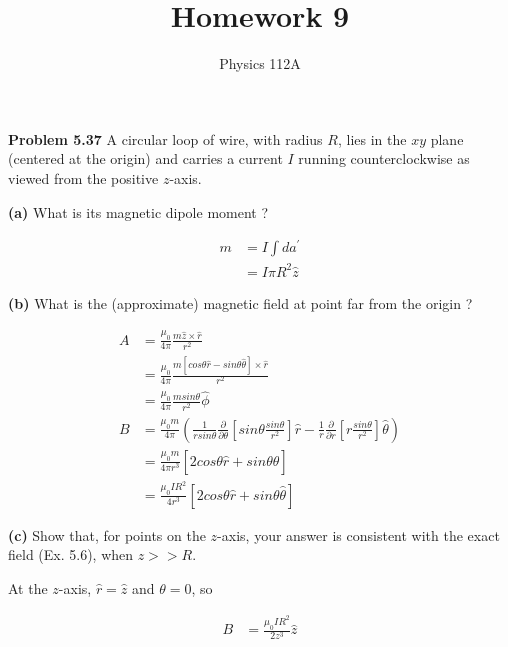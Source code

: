 \documentclass{article}
\title{Homework 9}
\author{Physics 112A}
\date{}
\begin{document}
\maketitle

\textbf{Problem 5.37}
A circular loop of wire, with radius $R$, lies in the $xy$ plane (centered at the origin) and carries a current $I$ running counterclockwise as viewed from the positive $z$-axis.

\textbf{(a)}
What is its magnetic dipole moment ?

\begin{equation*}
\begin{split}
	m & = I \int da^\prime \\
	& = \boxed{I \pi R^2 \hat{z}}
\end{split}
\end{equation*}

\textbf{(b)}
What is the (approximate) magnetic field at point far from the origin ?

\begin{equation*}
\begin{split}
	A & = \frac{\mu_0}{4 \pi} \frac{m \hat{z} \times \hat{r}}{r^2} \\
	& = \frac{\mu_0}{4 \pi} \frac{m [cos\theta \hat{r} - sin\theta \hat{\theta}] \times \hat{r}}{r^2} \\
	& = \frac{\mu_0}{4 \pi} \frac{m sin\theta}{r^2} \hat{\phi} \\
	B & = \frac{\mu_0 m}{4 \pi} (\frac{1}{r sin\theta} \frac{\partial}{\partial \theta} [sin\theta \frac{sin\theta}{r^2}] \hat{r} - \frac{1}{r} \frac{\partial}{\partial r} [r \frac{sin\theta}{r^2}] \hat{\theta}) \\
	& = \frac{\mu_0 m}{4 \pi r^3} [2 cos\theta \hat{r} + sin\theta \hat{\theta}] \\
	& = \boxed{\frac{\mu_0 I R^2}{4 r^3} [2 cos\theta \hat{r} + sin\theta \hat{\theta}]}
\end{split}
\end{equation*}

\textbf{(c)}
Show that, for points on the $z$-axis, your answer is consistent with the exact field (Ex. 5.6), when $z >> R$.

At the $z$-axis, $\hat{r} = \hat{z}$ and $\theta = 0$, so

\begin{equation*}
\begin{split}
	B & = \frac{\mu_0 I R^2}{2 z^3} \hat{z}
\end{split}
\end{equation*}
\end{document}
